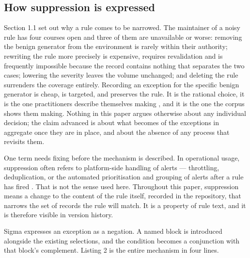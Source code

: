 \subsection{How suppression is expressed}

Section 1.1 set out why a rule comes to be narrowed. The maintainer of a noisy rule has four courses open and three of them are unavailable or worse: removing the benign generator from the environment is rarely within their authority; rewriting the rule more precisely is expensive, requires revalidation and is frequently impossible because the record contains nothing that separates the two cases; lowering the severity leaves the volume unchanged; and deleting the rule surrenders the coverage entirely. Recording an exception for the specific benign generator is cheap, is targeted, and preserves the rule. It is the rational choice, it is the one practitioners describe themselves making \citep{vermeer2023}, and it is the one the corpus shows them making. Nothing in this paper argues otherwise about any individual decision; the claim advanced is about what becomes of the exceptions in aggregate once they are in place, and about the absence of any process that revisits them.

One term needs fixing before the mechanism is described. In operational usage, suppression often refers to platform-side handling of alerts --- throttling, deduplication, or the automated prioritisation and grouping of alerts after a rule has fired \citep{vanede2022,wang2024}. That is not the sense used here. Throughout this paper, suppression means a change to the content of the rule itself, recorded in the repository, that narrows the set of records the rule will match. It is a property of rule text, and it is therefore visible in version history.

Sigma expresses an exception as a negation. A named block is introduced alongside the existing selections, and the condition becomes a conjunction with that block's complement. Listing 2 is the entire mechanism in four lines.

